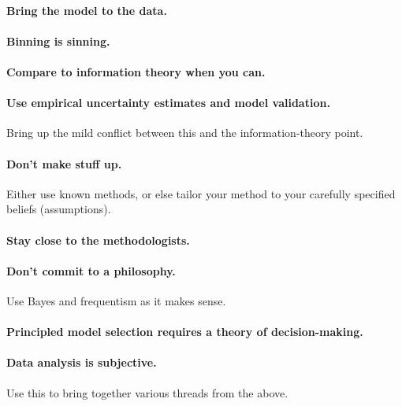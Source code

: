 \documentclass[12pt,twoside,pdftex]{article}
\begin{document}
\paragraph{Bring the model to the data.}

\paragraph{Binning is sinning.}

\paragraph{Compare to information theory when you can.}

\paragraph{Use empirical uncertainty estimates and model validation.}
Bring up the mild conflict between this and the information-theory
point.

\paragraph{Don't make stuff up.}
Either use known methods, or else tailor your method to your carefully
specified beliefs (assumptions).

\paragraph{Stay close to the methodologists.}

\paragraph{Don't commit to a philosophy.}
Use Bayes and frequentism as it makes sense.

\paragraph{Principled model selection requires a theory of decision-making.}

\paragraph{Data analysis is subjective.}
Use this to bring together various threads from the above.

\clearpage
{}\theendnotes
\end{document}
